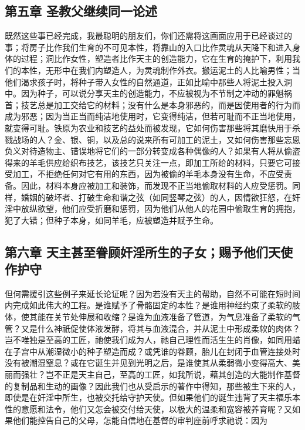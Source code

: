 \subsection{第五章 圣教父继续同一论述}

既然这些事已经完成，我最聪明的朋友们，你们还需将这画面应用于已经谈过的事；将房子比作我们生育的不可见本性，将靠山的入口比作灵魂从天降下和进入身体的过程；洞比作女性，塑造者比作天主的创造能力，它在生育的掩护下，利用我们的本性，无形中在我们内塑造人，为灵魂制作外衣。搬运泥土的人比喻男性；当他们渴求孩子时，将种子带入女性的自然通道，正如比喻中那些人将泥土投入洞中。因为种子，可以说分享天主的创造能力，不应被视为不节制之冲动的罪魁祸首；技艺总是加工交给它的材料；没有什么是本身邪恶的，而是因使用者的行为而成为邪恶；因为当正当而纯洁地使用时，它变得纯洁，但若可耻而不正当地使用，就变得可耻。铁原为农业和技艺的益处而被发现，它如何伤害那些将其磨快用于杀戮战场的人？金、银、铜，以及总的说来所有可加工的泥土，又如何伤害那些忘恩负义对待造物主、错误地将它们的一部分转变成各种偶像的人？如果有人将从偷盗得来的羊毛供应给织布技艺，该技艺只关注一点，即加工所给的材料，只要它可接受加工，不拒绝任何对它有用的东西，因为被偷的羊毛本身没有生命，不应受责备。因此，材料本身应被加工和装饰，而发现不正当地偷取材料的人应受惩罚。同样，婚姻的破坏者、打破生命和谐之弦（如同竖琴之弦）的人，因情欲狂怒，在奸淫中放纵欲望，他们应受折磨和惩罚，因为他们从他人的花园中偷取生育的拥抱，犯了大错；但种子本身，如同羊毛，应被塑造并赋予生命。\par


\subsection{第六章 天主甚至眷顾奸淫所生的子女；赐予他们天使作护守}

但何需援引这些例子来延长论证呢？因为若没有天主的帮助，自然不可能在短时间内完成如此伟大的工程。是谁赋予了骨骼固定的本性？是谁用神经约束了柔软的肢体，使其能在关节处伸展和收缩？是谁为血液准备了管道，为气息准备了柔软的气管？又是什么神祇促使体液发酵，将其与血液混合，并从泥土中形成柔软的肉体？岂不唯独是至高的工匠，祂使我们成为人，祂自己理性而活生生的肖像，如同用蜡在子宫中从潮湿微小的种子塑造而成？或凭谁的眷顾，胎儿在封闭于血管连接处时没有被潮湿窒息？或在它诞生并见到光明之后，是谁使其从柔弱微小变得高大、美丽而强壮？岂不正是天主自己，至高的工匠，如我所说，藉其创造的大能制作基督的复制品和生动的画像？因此我们也从受启示的著作中得知，那些被生下来的人，即使是在奸淫中所生，也被交托给守护天使。但如果他们的诞生违背了天主福乐本性的意愿和法令，他们又怎会被交付给天使，以极大的温柔和宽容被养育呢？又如果他们能控告自己的父母，怎能自信地在基督的审判座前呼求祂说：因为\par

